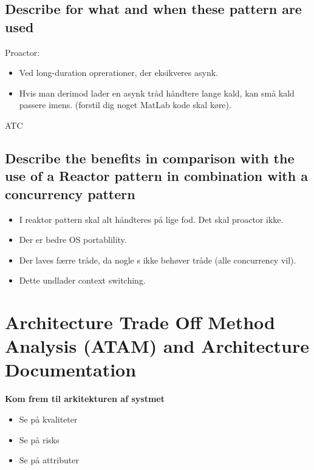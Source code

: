 \documentclass{article}
\begin{document}
\subsection{Describe for what and when these pattern are used}

Proactor:
\vspace{-10pt}
\begin{itemize}
	\item Ved long-duration oprerationer, der eksikveres asynk.
	\item Hvis man derimod lader en asynk tråd håndtere lange kald, kan små kald passere imens. (forstil dig noget MatLab kode skal køre).
\end{itemize}

ATC


\subsection{Describe the benefits in comparison with the use of a Reactor pattern in combination with a concurrency pattern}


\begin{itemize}
	\item I reaktor pattern skal alt håndteres på lige fod. Det skal proactor ikke.
	\item Der er bedre OS portablility.
	\item Der laves færre tråde, da nogle s ikke behøver tråde (alle concurrency vil).
	\item Dette undlader context switching.
\end{itemize}






\newpage
\section{Architecture Trade Off Method Analysis (ATAM) and Architecture Documentation}
\textbf{Kom frem til arkitekturen af systmet}
\begin{itemize}
	\item Se på kvaliteter
	\item Se på risks
	\item Se på attributer
\end{itemize}
\end{document}
